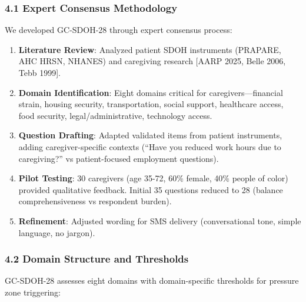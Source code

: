 \documentclass[
]{article}
\begin{document}
\subsubsection{4.1 Expert Consensus
Methodology}\label{expert-consensus-methodology}

We developed GC-SDOH-28 through expert consensus process:

\begin{enumerate}
\def\labelenumi{\arabic{enumi}.}
\item
  \textbf{Literature Review}: Analyzed patient SDOH instruments
  (PRAPARE, AHC HRSN, NHANES) and caregiving research {[}AARP 2025,
  Belle 2006, Tebb 1999{]}.
\item
  \textbf{Domain Identification}: Eight domains critical for
  caregivers---financial strain, housing security, transportation,
  social support, healthcare access, food security,
  legal/administrative, technology access.
\item
  \textbf{Question Drafting}: Adapted validated items from patient
  instruments, adding caregiver-specific contexts (``Have you reduced
  work hours due to caregiving?'' vs patient-focused employment
  questions).
\item
  \textbf{Pilot Testing}: 30 caregivers (age 35-72, 60\% female, 40\%
  people of color) provided qualitative feedback. Initial 35 questions
  reduced to 28 (balance comprehensiveness vs respondent burden).
\item
  \textbf{Refinement}: Adjusted wording for SMS delivery (conversational
  tone, simple language, no jargon).
\end{enumerate}

\subsubsection{4.2 Domain Structure and
Thresholds}\label{domain-structure-and-thresholds}

GC-SDOH-28 assesses eight domains with domain-specific thresholds for
pressure zone triggering:
\end{document}
